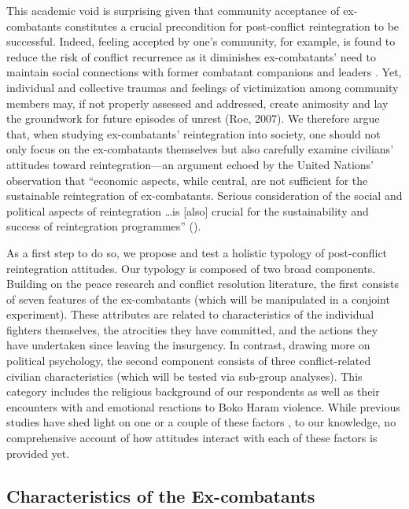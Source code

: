 This academic void is surprising given that community acceptance of ex-combatants constitutes a crucial precondition for post-conflict reintegration to be successful. Indeed, feeling accepted by one's community, for example, is found to reduce the risk of conflict recurrence as it diminishes ex-combatants' need to maintain social connections with former combatant companions and leaders \citep{Kaplan2018}. Yet, individual and collective traumas and feelings of victimization among community members may, if not properly assessed and addressed, create animosity and lay the groundwork for future episodes of unrest (Roe, 2007). We therefore argue that, when studying ex-combatants' reintegration into society, one should not only focus on the ex-combatants themselves but also carefully examine civilians' attitudes toward reintegration---an argument echoed by the United Nations' observation that ``economic aspects, while central, are not sufficient for the sustainable reintegration of ex-combatants. Serious consideration of the social and political aspects of reintegration \dots is [also] crucial for the sustainability and success of reintegration programmes'' (\citeyear[][p. 157]{UN2014}). 


As a first step to do so, we propose and test a holistic typology of post-conflict reintegration attitudes. Our typology is composed of two broad components. Building on the peace research and conflict resolution literature, the first consists of seven features of the ex-combatants (which will be manipulated in a conjoint experiment). These attributes are related to characteristics of the individual fighters themselves, the atrocities they have committed, and the actions they have undertaken since leaving the insurgency. In contrast, drawing more on political psychology, the second component consists of three conflict-related civilian characteristics (which will be tested via sub-group analyses). This category includes the religious background of our respondents as well as their encounters with and emotional reactions to Boko Haram violence. While previous studies have shed light on one or a couple of these factors \citep[e.g.,][]{Clubb2019}, to our knowledge, no comprehensive account of how attitudes interact with each of these factors is provided yet.


\subsection{Characteristics of the Ex-combatants}
